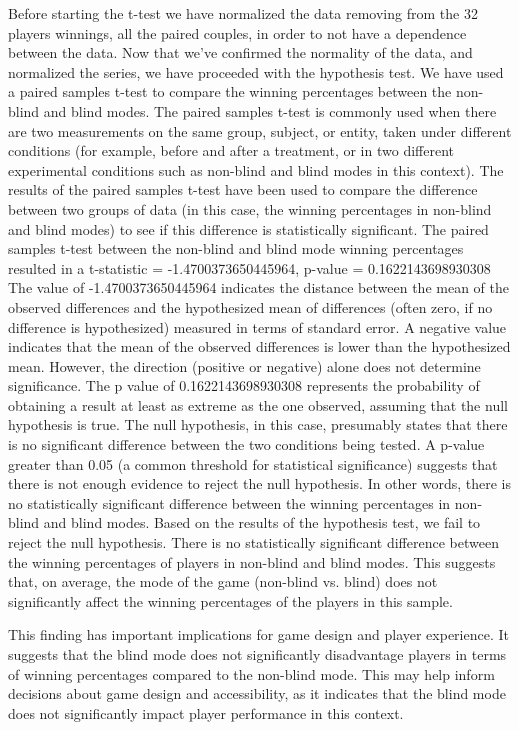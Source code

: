 \documentclass[11pt,a4paper]{report}
\begin{document}
\noindent Before starting the t-test we have normalized the data removing from the 32 players winnings, all the paired couples, in order to not have a dependence between the data.
Now that we've confirmed the normality of the data, and normalized the series, we have proceeded with the hypothesis test. We have used a paired samples t-test to compare the winning percentages between the non-blind and blind modes. The paired samples t-test is commonly used when there are two measurements on the same group, subject, or entity, taken under different conditions (for example, before and after a treatment, or in two different experimental conditions such as non-blind and blind modes in this context).
The results of the paired samples t-test have been used to compare the difference between two groups of data (in this case, the winning percentages in non-blind and blind modes) to see if this difference is statistically significant. 
The paired samples t-test between the non-blind and blind mode winning percentages resulted in a t-statistic = -1.4700373650445964, p-value = 0.1622143698930308
The value of -1.4700373650445964 indicates the distance between the mean of the observed differences and the hypothesized mean of differences (often zero, if no difference is hypothesized) measured in terms of standard error. A negative value indicates that the mean of the observed differences is lower than the hypothesized mean. However, the direction (positive or negative) alone does not determine significance.
The p value of 0.1622143698930308 represents the probability of obtaining a result at least as extreme as the one observed, assuming that the null hypothesis is true. The null hypothesis, in this case, presumably states that there is no significant difference between the two conditions being tested. A p-value greater than 0.05 (a common threshold for statistical significance) suggests that there is not enough evidence to reject the null hypothesis. In other words, there is no statistically significant difference between the winning percentages in non-blind and blind modes.
Based on the results of the hypothesis test, we fail to reject the null hypothesis. There is no statistically significant difference between the winning percentages of players in non-blind and blind modes. This suggests that, on average, the mode of the game (non-blind vs. blind) does not significantly affect the winning percentages of the players in this sample.

\noindent This finding has important implications for game design and player experience. It suggests that the blind mode does not significantly disadvantage players in terms of winning percentages compared to the non-blind mode. This may help inform decisions about game design and accessibility, as it indicates that the blind mode does not significantly impact player performance in this context.
\end{document}
